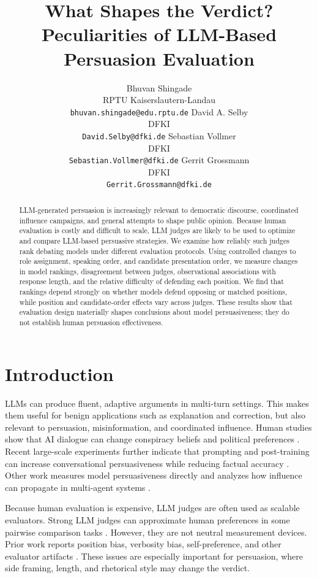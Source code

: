\documentclass{article}
\title{What Shapes the Verdict?\\Peculiarities of LLM-Based Persuasion Evaluation}
\author{
  Bhuvan Shingade\\
  RPTU Kaiserslautern-Landau\\
\texttt{bhuvan.shingade@edu.rptu.de}
  \And
  David A. Selby\\
  DFKI\\
\texttt{David.Selby@dfki.de}
  \And
  Sebastian Vollmer\\
  DFKI\\
\texttt{Sebastian.Vollmer@dfki.de}
  \And
  Gerrit Grossmann\\
  DFKI\\
\texttt{Gerrit.Grossmann@dfki.de} }
\begin{document}
\maketitle


\begin{abstract}
LLM-generated persuasion is increasingly relevant to democratic discourse, coordinated influence campaigns, and general attempts to shape public opinion. Because human evaluation is costly and difficult to scale, LLM judges are likely to be used to optimize and compare LLM-based persuasive strategies. We examine how reliably such judges rank debating models under different evaluation protocols. Using controlled changes to role assignment, speaking order, and candidate presentation order, we measure changes in model rankings, disagreement between judges, observational associations with response length, and the relative difficulty of defending each position. We find that rankings depend strongly on whether models defend opposing or matched positions, while position and candidate-order effects vary across judges. These results show that evaluation design materially shapes conclusions about model persuasiveness; they do not establish human persuasion effectiveness.
\end{abstract}

\section{Introduction}

LLMs can produce fluent, adaptive arguments in multi-turn settings. This makes them useful for benign applications such as explanation and correction, but also relevant to persuasion, misinformation, and coordinated influence. Human studies show that AI dialogue can change conspiracy beliefs and political preferences \citep{costello2024conspiracy,lin2025voters}. Recent large-scale experiments further indicate that prompting and post-training can increase conversational persuasiveness while reducing factual accuracy \citep{hackenburg2025levers}. Other work measures model persuasiveness directly \citep{durmus2024persuasiveness,singh2024persuasionbench} and analyzes how influence can propagate in multi-agent systems \citep{abedini2026stubborn}.

Because human evaluation is expensive, LLM judges are often used as scalable evaluators. Strong LLM judges can approximate human preferences in some pairwise comparison tasks \citep{zheng2023judge}. However, they are not neutral measurement devices. Prior work reports position bias, verbosity bias, self-preference, and other evaluator artifacts \citep{wang2024faireval,shi2024positionbias,panickssery2024selfpreference,chen2024judgementbias}. These issues are especially important for persuasion, where side framing, length, and rhetorical style may change the verdict.
\end{document}

